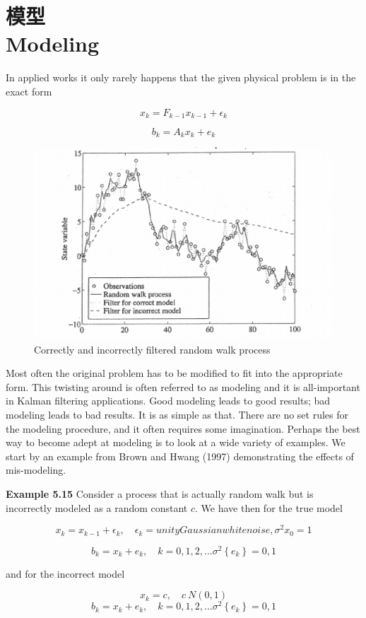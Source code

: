 \section[模型]{模型\\Modeling}
In applied works it only rarely happens that the given physical problem is in the exact form

\[ x_{k}=F_{k-1}x_{k-1}+\epsilon_{k} \]

\[ b_{k}=A_{k}x_{k}+e_{k} \]

\begin{figure}[h]
	\centering
	\includegraphics[width=0.7\linewidth]{TeX_files/Part02/chapter05/image/3}
	\caption{Correctly and incorrectly filtered random walk process}
\end{figure}

 
Most often the original problem has to be modified to fit into the appropriate form. This twisting around is often referred to as modeling and it is all-important in Kalman filtering applications. Good modeling leads to good results; bad modeling leads to bad results. It is as simple as that. There are no set rules for the modeling procedure, and it often requires some imagination. Perhaps the best way to become adept at modeling is to look at a wide variety of examples. We start by an example from Brown and Hwang (1997) demonstrating the effects of mis-modeling.
 

\textbf{ Example 5.15} Consider a process that is actually random walk but is incorrectly modeled as a random constant $ c$. We have then for the true model 

\[ x_{k}=x_{k-1}+\epsilon_{k}, \quad \epsilon_{k}=unity Gaussian white noise,\sigma^{2}{x_{0}}=1 \]

\[ b_{k}=x_{k}+e_{k},\quad k=0,1,2,...\sigma^{2}\left\lbrace e_{k}\right\rbrace =0,1\]

and for the incorrect model

\[ x_{k}=c,\quad c~N(0,1) \]
\[ b_{k}=x_{k}+e_{k},\quad k=0,1,2,...\sigma^{2}\left\lbrace e_{k}\right\rbrace=0,1 \]

